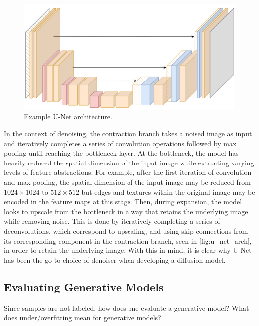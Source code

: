 \documentclass[11pt]{article}
\begin{document}
\begin{figure}[t]
    \centering
    \includegraphics[width=\textwidth]{./figures/generative_models/unet.png}
    \caption{Example U-Net architecture.}
    \label{fig:u_net_arch}
\end{figure}

In the context of denoising, the contraction branch takes a noised image as input and iteratively completes a series of convolution operations followed by max pooling until reaching the bottleneck layer. At the bottleneck, the model has heavily reduced the spatial dimension of the input image while extracting varying levels of feature abstractions. For example, after the first iteration of convolution and max pooling, the spatial dimension of the input image may be reduced from $1024\times1024$ to $512\times512$ but edges and textures within the original image may be encoded in the feature maps at this stage. Then, during expansion, the model looks to upscale from the bottleneck in a way that retains the underlying image while removing noise. This is done by iteratively completing a series of deconvolutions, which correspond to upscaling, and using skip connections from its corresponding component in the contraction branch, seen in \autoref{fig:u_net_arch}, in order to retain the underlying image. With this in mind, it is clear why U-Net has been the go to choice of denoiser when developing a diffusion model.

\subsection{\TODO Evaluating Generative Models}
Since samples are not labeled, how does one evaluate a generative model? What does under/overfitting mean for generative models?

\end{document}
